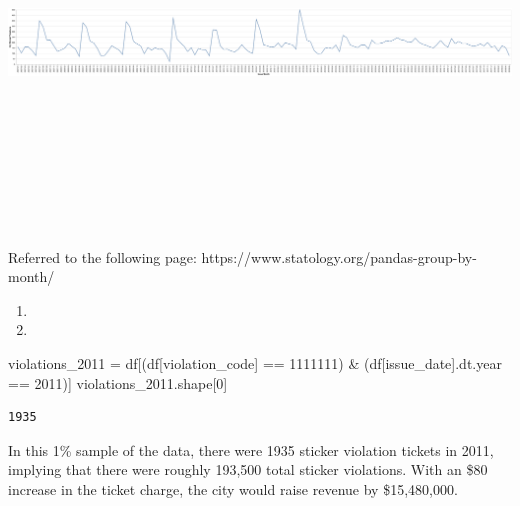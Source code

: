 \documentclass[
]{article}
\newenvironment{Shaded}{\begin{snugshade}}{\end{snugshade}}
\newcommand{\DecValTok}[1]{\textcolor[rgb]{0.68,0.00,0.00}{#1}}
\newcommand{\NormalTok}[1]{\textcolor[rgb]{0.00,0.23,0.31}{#1}}
\newcommand{\OperatorTok}[1]{\textcolor[rgb]{0.37,0.37,0.37}{#1}}
\newcommand{\StringTok}[1]{\textcolor[rgb]{0.13,0.47,0.30}{#1}}
\providecommand{\tightlist}{%
  \setlength{\itemsep}{0pt}\setlength{\parskip}{0pt}}\usepackage{longtable,booktabs,array}
\begin{document}
\includegraphics[width=29.05208in,height=3.89583in]{pset2_template_files/figure-pdf/cell-14-output-1.png}

Referred to the following page:
https://www.statology.org/pandas-group-by-month/

\begin{enumerate}
\def\labelenumi{\arabic{enumi}.}
\setcounter{enumi}{1}
\tightlist
\item
\item
\end{enumerate}

\begin{Shaded}
\begin{Highlighting}[]
\NormalTok{violations\_2011 }\OperatorTok{=}\NormalTok{ df[(df[}\StringTok{\textquotesingle{}violation\_code\textquotesingle{}}\NormalTok{] }\OperatorTok{==} \StringTok{\textquotesingle{}1111111\textquotesingle{}}\NormalTok{) }\OperatorTok{\&}\NormalTok{ (df[}\StringTok{\textquotesingle{}issue\_date\textquotesingle{}}\NormalTok{].dt.year }\OperatorTok{==} \DecValTok{2011}\NormalTok{)]}
\NormalTok{violations\_2011.shape[}\DecValTok{0}\NormalTok{]}
\end{Highlighting}
\end{Shaded}

\begin{verbatim}
1935
\end{verbatim}

In this 1\% sample of the data, there were 1935 sticker violation
tickets in 2011, implying that there were roughly 193,500 total sticker
violations. With an \$80 increase in the ticket charge, the city would
raise revenue by \$15,480,000.
\end{document}
